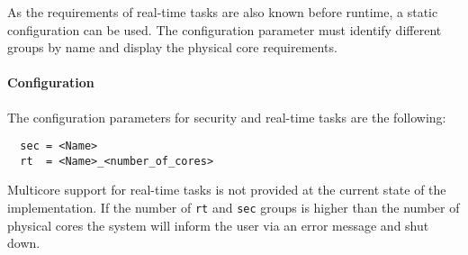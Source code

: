 As the requirements of real-time tasks are also known before runtime, a static
configuration can be used.
The configuration parameter must identify different groups by name
and display the physical core requirements.


\paragraph{Configuration}
The configuration parameters for security and real-time tasks are the
following:
\begin{lstlisting}
  sec = <Name>
  rt  = <Name>_<number_of_cores>
\end{lstlisting}

Multicore support for real-time tasks is not provided at the current state of
the implementation.
If the number of \texttt{rt} and \texttt{sec} groups is higher than the number
of physical cores the system will inform the user via an error message and shut
down.
